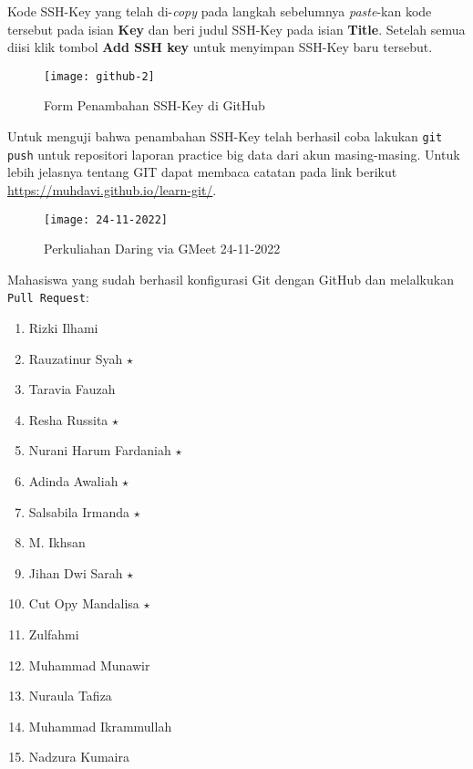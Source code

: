 \documentclass[a4paper]{tufte-handout}
\begin{document}
\begin{enumerate}
Kode SSH-Key yang telah di-\textit{copy} pada langkah sebelumnya \textit{paste}-kan kode tersebut pada isian \textbf{Key} dan beri judul SSH-Key pada isian \textbf{Title}. Setelah semua diisi klik tombol \textbf{Add SSH key} untuk menyimpan SSH-Key baru tersebut.

\begin{figure}[!ht]
\texttt{[image: github-2]}
\caption{Form Penambahan SSH-Key di GitHub}
\label{gam:form-ssh}
\end{figure}

Untuk menguji bahwa penambahan SSH-Key telah berhasil coba lakukan {\tt git push} untuk repositori laporan practice big data dari akun masing-masing. Untuk lebih jelasnya tentang GIT dapat membaca catatan pada link berikut \url{https://muhdavi.github.io/learn-git/}.
\end{enumerate}

\begin{figure}[!ht]
\texttt{[image: 24-11-2022]}
\caption{Perkuliahan Daring via GMeet 24-11-2022}
\label{gam:form-ssh}
\end{figure}

\clearpage
{}


Mahasiswa yang sudah berhasil konfigurasi Git dengan GitHub dan melalkukan {\tt Pull Request}:
\begin{multicols}{2}
\begin{enumerate}
\item Rizki Ilhami
\item Rauzatinur Syah $\star$
\item Taravia Fauzah
\item Resha Russita $\star$
\item Nurani Harum Fardaniah $\star$
\item Adinda Awaliah $\star$
\item Salsabila Irmanda $\star$
\item M. Ikhsan
\item Jihan Dwi Sarah $\star$
\item Cut Opy Mandalisa $\star$
\item Zulfahmi
\item Muhammad Munawir
\item Nuraula Tafiza
\item Muhammad Ikrammullah
\item Nadzura Kumaira
\end{enumerate}
\end{multicols}
\end{document}
